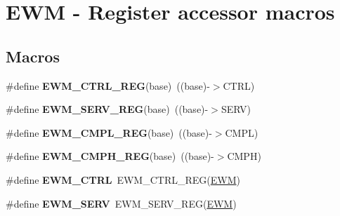 \hypertarget{group__EWM__Register__Accessor__Macros}{}\section{E\+WM -\/ Register accessor macros}
\label{group__EWM__Register__Accessor__Macros}
\subsection*{Macros}
\begin{DoxyCompactItemize}
\item 
\#define {\bfseries E\+W\+M\+\_\+\+C\+T\+R\+L\+\_\+\+R\+EG}(base)~((base)-\/$>$C\+T\+RL)\hypertarget{group__EWM__Register__Accessor__Macros_ga19c5b64d8c44409c3b6e74b1eb8fb521}{}\label{group__EWM__Register__Accessor__Macros_ga19c5b64d8c44409c3b6e74b1eb8fb521}

\item 
\#define {\bfseries E\+W\+M\+\_\+\+S\+E\+R\+V\+\_\+\+R\+EG}(base)~((base)-\/$>$S\+E\+RV)\hypertarget{group__EWM__Register__Accessor__Macros_ga285d135a240a9d0a7c58b85a0b2dd23c}{}\label{group__EWM__Register__Accessor__Macros_ga285d135a240a9d0a7c58b85a0b2dd23c}

\item 
\#define {\bfseries E\+W\+M\+\_\+\+C\+M\+P\+L\+\_\+\+R\+EG}(base)~((base)-\/$>$C\+M\+PL)\hypertarget{group__EWM__Register__Accessor__Macros_ga8dc15064be76c4bce6641ce8569ddec1}{}\label{group__EWM__Register__Accessor__Macros_ga8dc15064be76c4bce6641ce8569ddec1}

\item 
\#define {\bfseries E\+W\+M\+\_\+\+C\+M\+P\+H\+\_\+\+R\+EG}(base)~((base)-\/$>$C\+M\+PH)\hypertarget{group__EWM__Register__Accessor__Macros_ga6d62283bb76a789fff9844349d09464e}{}\label{group__EWM__Register__Accessor__Macros_ga6d62283bb76a789fff9844349d09464e}

\item 
\#define {\bfseries E\+W\+M\+\_\+\+C\+T\+RL}~E\+W\+M\+\_\+\+C\+T\+R\+L\+\_\+\+R\+EG(\hyperlink{group__EWM__Peripheral__Access__Layer_ga4c690a7633d3de9e8469adc23f784085}{E\+WM})\hypertarget{group__EWM__Register__Accessor__Macros_ga643f3468793754e6d82c2fd8cefb5df7}{}\label{group__EWM__Register__Accessor__Macros_ga643f3468793754e6d82c2fd8cefb5df7}

\item 
\#define {\bfseries E\+W\+M\+\_\+\+S\+E\+RV}~E\+W\+M\+\_\+\+S\+E\+R\+V\+\_\+\+R\+EG(\hyperlink{group__EWM__Peripheral__Access__Layer_ga4c690a7633d3de9e8469adc23f784085}{E\+WM})\hypertarget{group__EWM__Register__Accessor__Macros_gad5ba7e470596823de41e4970dd7b8dee}{}\label{group__EWM__Register__Accessor__Macros_gad5ba7e470596823de41e4970dd7b8dee}


\end{DoxyCompactItemize}
